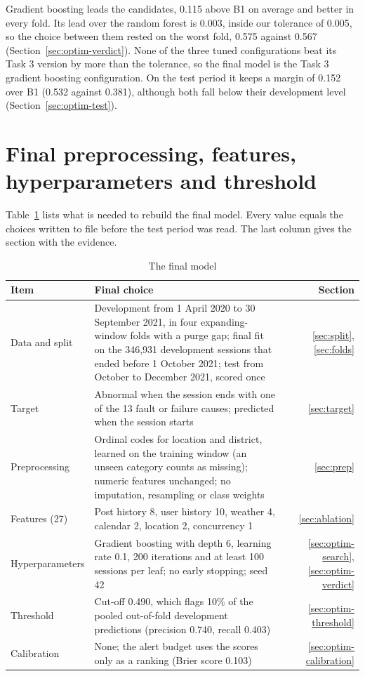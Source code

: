 \documentclass[12pt,a4paper,openany]{report}
\begin{document}
Gradient boosting leads the candidates, 0.115 above B1 on average and better in every fold. Its lead over the
random forest is 0.003, inside our tolerance of 0.005, so the choice between them rested on the worst fold, 0.575
against 0.567 (Section~\ref{sec:optim-verdict}). None of the three tuned configurations beat its Task 3 version by
more than the tolerance, so the final model is the Task 3 gradient boosting configuration. On the test period it
keeps a margin of 0.152 over B1 (0.532 against 0.381), although both fall below their development level
(Section~\ref{sec:optim-test}).

\section{Final preprocessing, features, hyperparameters and threshold}\label{sec:final-spec}

Table~\ref{tab:final-spec} lists what is needed to rebuild the final model. Every value equals the choices written
to file before the test period was read. The last column gives the section with the evidence.

\begin{table}[!htb]
  \centering\small
  \caption{The final model}
  \label{tab:final-spec}
  \begin{tabularx}{\textwidth}{@{}l>{\raggedright\arraybackslash}Xr@{}}
    \toprule
    Item & Final choice & Section \\
    \midrule
    Data and split & Development from 1 April 2020 to 30 September 2021, in four expanding-window folds with a
      purge gap; final fit on the 346,931 development sessions that ended before 1 October 2021; test from October
      to December 2021, scored once & \ref{sec:split}, \ref{sec:folds} \\
    Target & Abnormal when the session ends with one of the 13 fault or failure causes; predicted when the session
      starts & \ref{sec:target} \\
    Preprocessing & Ordinal codes for location and district, learned on the training window (an unseen category
      counts as missing); numeric features unchanged; no imputation, resampling or class weights & \ref{sec:prep} \\
    Features (27) & Post history 8, user history 10, weather 4, calendar 2, location 2, concurrency 1
      & \ref{sec:ablation} \\
    Hyperparameters & Gradient boosting with depth 6, learning rate 0.1, 200 iterations and at least 100 sessions
      per leaf; no early stopping; seed 42 & \ref{sec:optim-search}, \ref{sec:optim-verdict} \\
    Threshold & Cut-off 0.490, which flags 10\% of the pooled out-of-fold development predictions (precision
      0.740, recall 0.403) & \ref{sec:optim-threshold} \\
    Calibration & None; the alert budget uses the scores only as a ranking (Brier score 0.103)
      & \ref{sec:optim-calibration} \\
    \bottomrule
  \end{tabularx}
\end{table}
\end{document}
